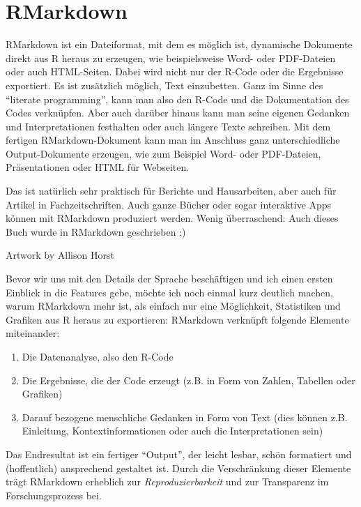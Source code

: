 \documentclass[
]{book}
\begin{document}
\hypertarget{rmarkdown}{%
\chapter{RMarkdown}\label{rmarkdown}}

RMarkdown ist ein Dateiformat, mit dem es möglich ist, dynamische Dokumente direkt aus R heraus zu erzeugen, wie beispielsweise Word- oder PDF-Dateien oder auch HTML-Seiten. Dabei wird nicht nur der R-Code oder die Ergebnisse exportiert. Es ist zusätzlich möglich, Text einzubetten. Ganz im Sinne des ``literate programming'', kann man also den R-Code und die Dokumentation des Codes verknüpfen. Aber auch darüber hinaus kann man seine eigenen Gedanken und Interpretationen festhalten oder auch längere Texte schreiben. Mit dem fertigen RMarkdown-Dokument kann man im Anschluss ganz unterschiedliche Output-Dokumente erzeugen, wie zum Beispiel Word- oder PDF-Dateien, Präsentationen oder HTML für Webseiten.

Das ist natürlich sehr praktisch für Berichte und Hausarbeiten, aber auch für Artikel in Fachzeitschriften. Auch ganze Bücher oder sogar interaktive Apps können mit RMarkdown produziert werden. Wenig überraschend: Auch dieses Buch wurde in RMarkdown geschrieben :)

Artwork by Allison Horst

Bevor wir uns mit den Details der Sprache beschäftigen und ich einen ersten Einblick in die Features gebe, möchte ich noch einmal kurz deutlich machen, warum RMarkdown mehr ist, als einfach nur eine Möglichkeit, Statistiken und Grafiken aus R heraus zu exportieren: RMarkdown verknüpft folgende Elemente miteinander:

\begin{enumerate}
\def\labelenumi{\arabic{enumi}.}
\item
  Die Datenanalyse, also den R-Code
\item
  Die Ergebnisse, die der Code erzeugt (z.B. in Form von Zahlen, Tabellen oder Grafiken)
\item
  Darauf bezogene menschliche Gedanken in Form von Text (dies können z.B. Einleitung, Kontextinformationen oder auch die Interpretationen sein)
\end{enumerate}

Das Endresultat ist ein fertiger ``Output'', der leicht lesbar, schön formatiert und (hoffentlich) ansprechend gestaltet ist. Durch die Verschränkung dieser Elemente trägt RMarkdown erheblich zur \emph{Reproduzierbarkeit} und zur Transparenz im Forschungsprozess bei.
\end{document}
